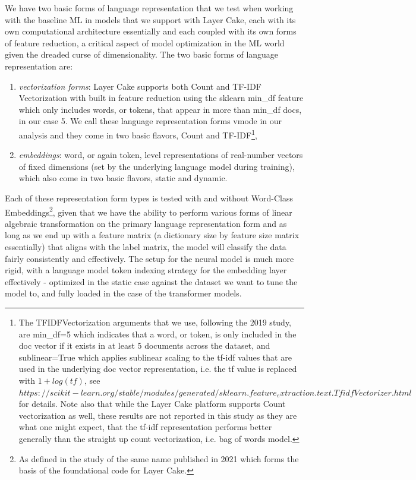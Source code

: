 \documentclass[final]{clv2025}
\begin{document}
We have two basic forms of language representation that we test when working with the baseline ML in models that we support with Layer Cake, each with its own computational architecture essentially and each coupled with its own forms of feature reduction, a critical aspect of model optimization in the ML world given the dreaded curse of dimensionality.  The two basic forms of language representation are:
\begin{enumerate}
	\setlength\itemsep{2pt}
    \item \textit{vectorization forms}: Layer Cake supports both Count and TF-IDF Vectorization with built in feature reduction using the sklearn min\_df feature which only includes words, or tokens, that appear in more than min\_df docs, in our case 5. We call these language representation forms vmode in our analysis and they come in two basic flavors, Count and TF-IDF\footnote{The TFIDFVectorization arguments that we use, following the 2019 study, are min\_df=5 which indicates that a word, or token, is only included in the doc vector if it exists in at least 5 documents across the dataset, and sublinear=True which applies sublinear scaling to the tf-idf values that are used in the underlying doc vector representation, i.e. the tf value is replaced with $1+log(tf)$, see $https://scikit-learn.org/stable/modules/generated/sklearn.feature_extraction.text.TfidfVectorizer.html$ for details. Note also that while the Layer Cake platform supports Count vectorization as well, these results are not reported in this study as they are what one might expect, that the tf-idf representation performs better generally than the straight up count vectorization, i.e. bag of words model.}, 
    \item \textit{embeddings}: word, or again token, level representations of real-number vectors of fixed dimensions (set by the underlying language model during training), which also come in two basic flavors, static and dynamic. 
\end{enumerate}
Each of these representation form types is tested with and without Word-Class Embeddings\footnote{As defined in the study of the same name published in 2021 \cite{moreo2021} which forms the basis of the foundational code for Layer Cake.}, given that we have the ability to perform various forms of linear algebraic transformation on the primary language representation form and as long as we end up with a feature matrix  (a  dictionary size by feature size matrix essentially) that aligns with the label matrix, the model will classify the data fairly consistently and effectively. The setup for the neural model is much more rigid, with a language model token indexing strategy for the embedding layer effectively - optimized in the static case against the dataset we want to tune the model to, and fully loaded in the case of the transformer models.   
\end{document}

